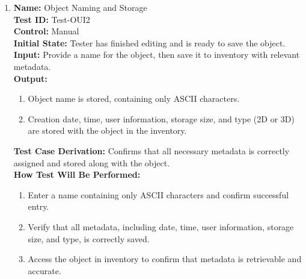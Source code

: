 \documentclass[12pt, titlepage]{article}
\begin{document}
\begin{enumerate}

  \item \textbf{Name:} Object Naming and Storage \label{itm:Test-OUI2} \\
        \textbf{Test ID:} Test-OUI2 \\
        \textbf{Control:} Manual \\
        \textbf{Initial State:} Tester has finished editing and is ready to save the object. \\
        \textbf{Input:} Provide a name for the object, then save it to inventory with relevant metadata. \\
        \textbf{Output:}
        \begin{enumerate}
          \item Object name is stored, containing only ASCII characters.
          \item Creation date, time, user information, storage size, and type (2D or 3D) are stored with the object in the inventory.
        \end{enumerate}
        \textbf{Test Case Derivation:} Confirms that all necessary metadata is correctly assigned and stored along with the object. \\
        \textbf{How Test Will Be Performed:}
        \begin{enumerate}
          \item Enter a name containing only ASCII characters and confirm successful entry.
          \item Verify that all metadata, including date, time, user information, storage size, and type, is correctly saved.
          \item Access the object in inventory to confirm that metadata is retrievable and accurate.
        \end{enumerate}


\end{enumerate}
\end{document}
